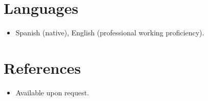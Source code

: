 \documentclass[11pt,a4paper,sans]{moderncv}
\begin{document}

\section{Languages}
\vspace{1pt}
\begin{itemize}
\item {Spanish (native), English (professional working proficiency).}
\end{itemize}


\section{References}
\vspace{1pt}
\begin{itemize}
\item{Available upon request.}
\end{itemize}
\end{document}
